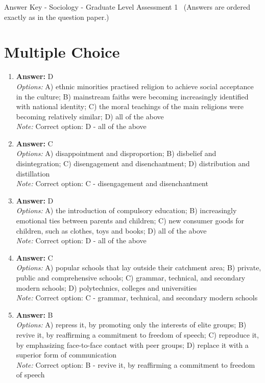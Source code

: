 \documentclass[12pt]{article}
\begin{document}
\begin{center}
Answer Key - Sociology - Graduate Level Assessment 1 \
\small (Answers are ordered exactly as in the question paper.)
\end{center}

\section*{Multiple Choice}
\begin{enumerate}[label=\arabic*.]
\item \textbf{Answer:} D
\\ \textit{Options:} A) ethnic minorities practised religion to achieve social acceptance in the culture; B) mainstream faiths were becoming increasingly identified with national identity; C) the moral teachings of the main religions were becoming relatively similar; D) all of the above
\\ \textit{Note:} Correct option: D - all of the above
\item \textbf{Answer:} C
\\ \textit{Options:} A) disappointment and disproportion; B) disbelief and disintegration; C) disengagement and disenchantment; D) distribution and distillation
\\ \textit{Note:} Correct option: C - disengagement and disenchantment
\item \textbf{Answer:} D
\\ \textit{Options:} A) the introduction of compulsory education; B) increasingly emotional ties between parents and children; C) new consumer goods for children, such as clothes, toys and books; D) all of the above
\\ \textit{Note:} Correct option: D - all of the above
\item \textbf{Answer:} C
\\ \textit{Options:} A) popular schools that lay outside their catchment area; B) private, public and comprehensive schools; C) grammar, technical, and secondary modern schools; D) polytechnics, colleges and universities
\\ \textit{Note:} Correct option: C - grammar, technical, and secondary modern schools
\item \textbf{Answer:} B
\\ \textit{Options:} A) repress it, by promoting only the interests of elite groups; B) revive it, by reaffirming a commitment to freedom of speech; C) reproduce it, by emphasizing face-to-face contact with peer groups; D) replace it with a superior form of communication
\\ \textit{Note:} Correct option: B - revive it, by reaffirming a commitment to freedom of speech
\end{enumerate}
\end{document}
